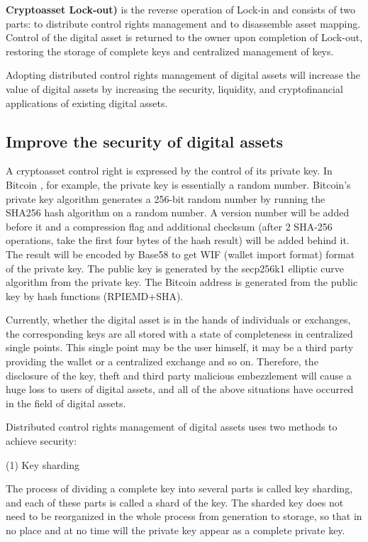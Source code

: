 \documentclass[a4paper,12pt]{article}
\begin{document}
\textbf{Cryptoasset Lock-out)} is the reverse operation of Lock-in and consists of two parts: to distribute control rights management and to disassemble asset mapping. Control of the digital asset is returned to the owner upon completion of Lock-out, restoring the storage of complete keys and centralized management of keys.

Adopting distributed control rights management of digital assets will increase the value of digital assets by increasing the security, liquidity, and cryptofinancial applications of existing digital assets.

\subsection{Improve the security of digital assets}
A cryptoasset control right is expressed by the control of its private key. In Bitcoin \citep{Satoshi2008}, for example, the private key is essentially a random number. Bitcoin's private key algorithm generates a 256-bit random number by running the SHA256 hash algorithm on a random number. A version number will be added before it and a compression flag and additional checksum (after 2 SHA-256 operations, take the first four bytes of the hash result) will be added behind it. The result will be encoded by Base58 to get WIF (wallet import format) format of the private key. The public key is generated by the secp256k1 elliptic curve algorithm from the private key. The Bitcoin address is generated from the public key by hash functions (RPIEMD+SHA).

Currently, whether the digital asset is in the hands of individuals or exchanges, the corresponding keys are all stored with a state of completeness in centralized single points. This single point may be the user himself, it may be a third party providing the wallet or a centralized exchange and so on. Therefore, the disclosure of the key, theft and third party malicious embezzlement will cause a huge loss to users of digital assets, and all of the above situations have occurred in the field of digital assets.

Distributed control rights management of digital assets uses two methods to achieve security:

(1) Key sharding

The process of dividing a complete key into several parts is called key sharding, and each of these parts is called a shard of the key. The sharded key does not need to be reorganized in the whole process from generation to storage, so that in no place and at no time will the private key appear as a complete private key.
\end{document}
